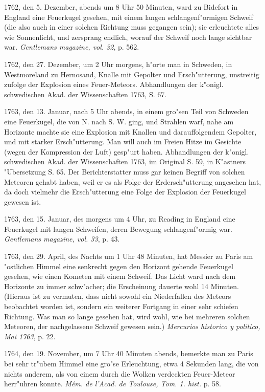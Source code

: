 \documentclass[a4paper, 11pt, oneside, polutonikogreek, german]{article}
\begin{document}
1762, den 5. Dezember, abends um 8 Uhr 50 Minuten, ward zu Bidefort in England eine Feuerkugel gesehen, mit einem langen schlangenf"ormigen Schweif (die also auch in einer solchen Richtung muss gegangen sein); sie erleuchtete alles wie Sonnenlicht, und zersprang endlich, worauf der Schweif noch lange sichtbar war. \emph{Gentlemans magazine, vol. 32}, p. 562.

1762, den 27. Dezember, um 2 Uhr morgens, h"orte man in Schweden, in Westmoreland zu Hernosand, Knalle mit Gepolter und Ersch"utterung, unstreitig zufolge der Explosion eines Feuer-Meteors. Abhandlungen der k"onigl. schwedischen Akad. der Wissenschaften 1763, S. 67.

1763, den 13. Januar, nach 5 Uhr abends, in einem gro"sen Teil von Schweden eine Feuerkugel, die von N. nach S. W. ging, und Strahlen warf, nahe am Horizonte machte sie eine Explosion mit Knallen und darauffolgendem Gepolter, und mit starker Ersch"utterung. Man will auch im Freien Hitze im Gesichte (wegen der Kompression der Luft) gesp"urt haben. Abhandlungen der k"onigl. schwedischen Akad. der Wissenschaften 1763, im Original S. 59, in K"astners "Ubersetzung S. 65. Der Berichterstatter muss gar keinen Begriff von solchen Meteoren gehabt haben, weil er es als Folge der Erdersch"utterung angesehen hat, da doch vielmehr die Ersch"utterung eine Folge der Explosion der Feuerkugel gewesen ist.

1763, den 15. Januar, des morgens um 4 Uhr, zu Reading in England eine Feuerkugel mit langen Schweifen, deren Bewegung schlangenf"ormig war. \emph{Gentlemans magazine, vol. 33}, p. 43.

1763, den 29. April, des Nachts um 1 Uhr 48 Minuten, hat Messier zu Paris am "ostlichen Himmel eine senkrecht gegen den Horizont gehende Feuerkugel gesehen, wie einen Kometen mit einem Schweif. Das Licht ward nach dem Horizonte zu immer schw"acher; die Erscheinung dauerte wohl 14 Minuten. (Hieraus ist zu vermuten, dass nicht sowohl ein Niederfallen des Meteors beobachtet worden ist, sondern ein weiterer Fortgang in einer sehr schiefen Richtung. Was man so lange gesehen hat, wird wohl, wie bei mehreren solchen Meteoren, der nachgelassene Schweif gewesen sein.) \emph{Mercurios historico y politico, Mai 1763}, p. 22.

1764, den 19. November, um 7 Uhr 40 Minuten abends, bemerkte man zu Paris bei sehr tr"ubem Himmel eine gro"se Erleuchtung, etwa 4 Sekunden lang, die von nichts anderem, als von einem durch die Wolken verdeckten Feuer-Meteor herr"uhren konnte. \emph{Mém. de l'Acad. de Toulouse, Tom. 1. hist.} p. 58.
\end{document}
